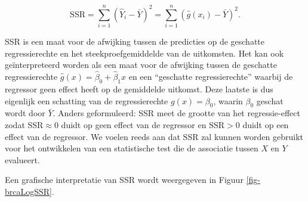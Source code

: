 \documentclass[
  dutch,
  letterpaper,
  12pt]{book}
\theoremstyle{definition}
\theoremstyle{definition}
\theoremstyle{definition}
\theoremstyle{remark}
\begin{document}
\[\text{SSR} = \sum_{i=1}^n (\hat{Y}_i - \bar{Y})^2 = \sum_{i=1}^n (\hat{g}(x_i) - \bar{Y})^2.\]

SSR is een maat voor de afwijking tussen de predicties op de geschatte
regressierechte en het steekproefgemiddelde van de uitkomsten. Het kan
ook geïnterpreteerd worden als een maat voor de afwijking tussen de
geschatte regressierechte \(\hat{g}(x)=\hat\beta_0+\hat\beta_1x\) en een
``geschatte regressierechte'' waarbij de regressor geen effect heeft op
de gemiddelde uitkomst. Deze laatste is dus eigenlijk een schatting van
de regressierechte \(g(x)=\beta_0\), waarin \(\beta_0\) geschat wordt
door \(\bar{Y}\). Anders geformuleerd: SSR meet de grootte van het
regressie-effect zodat \(\text{SSR} \approx 0\) duidt op geen effect van
de regressor en \(\text{SSR}>0\) duidt op een effect van de regressor.
We voelen reeds aan dat \(\text{SSR}\) zal kunnen worden gebruikt voor
het ontwikkelen van een statistische test die de associatie tussen \(X\)
en \(Y\) evalueert.

Een grafische interpretatie van SSR wordt weergegeven in Figuur
\ref{fig-brcaLogSSR}.
\end{document}
